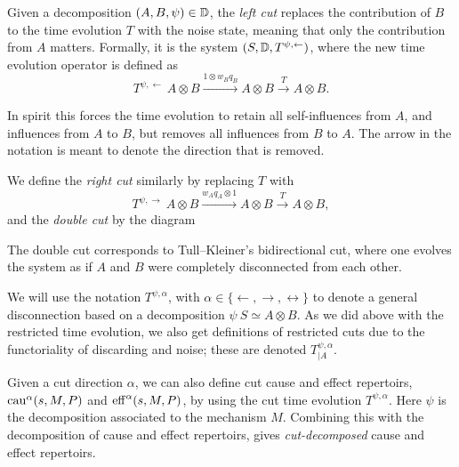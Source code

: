 \begin{definition}
    Given a decomposition $(A, B, \psi) \in \mathbb{D}$, the \emph{left cut} replaces the contribution of $B$ to the time evolution $T$ with the noise state, meaning that only the contribution from $A$ matters. Formally, it is the system $(S, \mathbb{D}, T^{\psi, \leftarrow})$, where the new time evolution operator is defined as
    $$T^{\psi, \leftarrow}\: A\otimes B \overset{1\otimes w_B q_B}\to A\otimes B \overset{T}\to A\otimes B.$$
\end{definition}

In spirit this forces the time evolution to retain all self-influences from $A$, and influences from $A$ to $B$, but removes all influences from $B$ to $A$. The arrow in the notation is meant to denote the direction that is removed. 

We define the \emph{right cut} similarly by replacing $T$ with
\[T^{\psi,\rightarrow}\: A\otimes B \overset{w_A q_A\otimes 1}\to A\otimes B \overset{T}\to A\otimes B,\]
and the \emph{double cut} by the diagram 
\begin{center}
\end{center}

\begin{remark}
    The double cut corresponds to Tull--Kleiner's bidirectional cut, where one evolves the system as if $A$ and $B$ were completely disconnected from each other. 
\end{remark}

We will use the notation $T^{\psi, \alpha}$, with $\alpha \in \{\leftarrow, \rightarrow, \leftrightarrow\}$ to denote a general disconnection based on a decomposition $\psi\: S\simeq A\otimes B$. As we did above with the restricted time evolution, we also get definitions of restricted cuts due to the functoriality of discarding and noise; these are denoted $T^{\psi, \alpha}_{\mid A}$.  

Given a cut direction $\alpha$, we can also define cut cause and effect repertoirs, $\mathrm{cau}^\alpha(s,M,P)$ and $\mathrm{eff}^\alpha(s,M,P)$, by using the cut time evolution $T^{\psi, \alpha}$. Here $\psi$ is the decomposition associated to the mechanism $M$. Combining this with the decomposition of cause and effect repertoirs, gives \emph{cut-decomposed} cause and effect repertoirs. 





